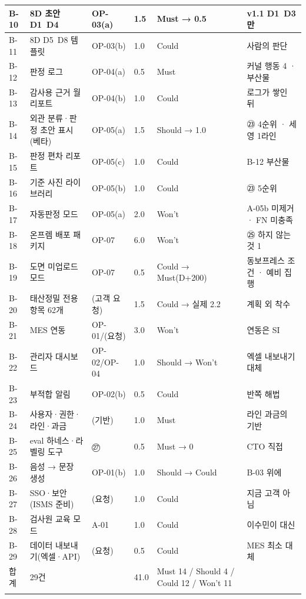 \documentclass[10pt,a4paper]{article}
\begin{document}
{\begin{tabularx}{\linewidth}{|L{14mm}|Y|L{18mm}|L{18mm}|L{18mm}|L{50mm}|}
B-10 & 8D 초안 D1~D4 & OP-03(a) & 1.5 & Must → 0.5 & v1.1 D1~D3만 \\ \hline
B-11 & 8D D5~D8 템플릿 & OP-03(b) & 1.0 & Could & 사람의 판단 \\ \hline
B-12 & 판정 로그 & OP-04(a) & 0.5 & Must & 커널 행동 4 · 부산물 \\ \hline
B-13 & 감사용 근거 월 리포트 & OP-04(b) & 1.0 & Could & 로그가 쌓인 뒤 \\ \hline
B-14 & 외관 분류·판정 초안 표시(베타) & OP-05(a) & 1.5 & Should → 1.0 & ㉓ 4순위 · 세영 1라인 \\ \hline
B-15 & 판정 편차 리포트 & OP-05(c) & 1.0 & Could & B-12 부산물 \\ \hline
B-16 & 기준 사진 라이브러리 & OP-05(b) & 1.0 & Could & ㉓ 5순위 \\ \hline
B-17 & 자동판정 모드 & OP-05(a) & 2.0 & Won't & A-05b 미제거 · FN 미충족 \\ \hline
B-18 & 온프렘 배포 패키지 & OP-07 & 6.0 & Won't & ㉕ 하지 않는 것 1 \\ \hline
B-19 & 도면 미업로드 모드 & OP-07 & 0.5 & Could → Must(D+200) & 동보프레스 조건 · 예비 집행 \\ \hline
B-20 & 태산정밀 전용 항목 62개 & (고객 요청) & 1.5 & Could → 실제 2.2 & 계획 외 착수 \\ \hline
B-21 & MES 연동 & OP-01/(요청) & 3.0 & Won't & 연동은 SI \\ \hline
B-22 & 관리자 대시보드 & OP-02/OP-04 & 1.0 & Should → Won't & 엑셀 내보내기 대체 \\ \hline
B-23 & 부적합 알림 & OP-02(b) & 0.5 & Could & 반쪽 해법 \\ \hline
B-24 & 사용자·권한·라인·과금 & (기반) & 1.0 & Must & 라인 과금의 기반 \\ \hline
B-25 & eval 하네스·라벨링 도구 & ㉗ & 0.5 & Must → 0 & CTO 직접 \\ \hline
B-26 & 음성 → 문장 생성 & OP-01(b) & 1.0 & Should → Could & B-03 위에 \\ \hline
B-27 & SSO·보안(ISMS 준비) & (요청) & 1.0 & Could & 지금 고객 아님 \\ \hline
B-28 & 검사원 교육 모드 & A-01 & 1.0 & Could & 이수민이 대신 \\ \hline
B-29 & 데이터 내보내기(엑셀·API) & (요청) & 0.5 & Could & MES 최소 대체 \\ \hline
합계 & 29건 &  & 41.0 & Must 14 / Should 4 / Could 12 / Won't 11 &  \\ \hline
\fi
\end{tabularx}}
\landscapeoff
\end{document}
